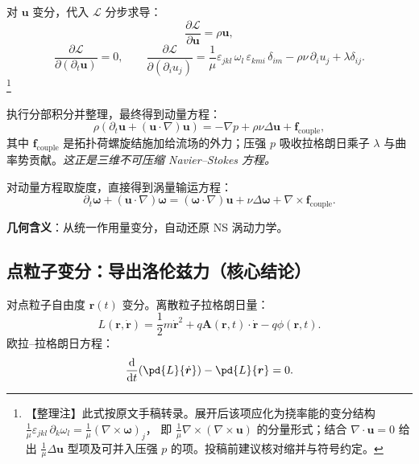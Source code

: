 \documentclass[11pt]{ctexart}
\newcommand{\ve}[1]{\bm{#1}}                         %
\newcommand{\Ltot}{\mathcal{L}}                      %
\begin{document}
对 $\ve{u}$ 变分，代入 $\Ltot$ 分步求导：
\begin{equation}
\frac{\partial\Ltot}{\partial\ve{u}}=\rho\ve{u},
\label{eq:du}
\end{equation}
\begin{equation}
\frac{\partial\Ltot}{\partial(\partial_{t}\ve{u})}=0,\qquad
\frac{\partial\Ltot}{\partial(\partial_{i}u_{j})}
=\frac{1}{\mu}\varepsilon_{jkl}\,\omega_{l}\,\varepsilon_{kmi}\,\delta_{im}
-\rho\nu\,\partial_{i}u_{j}+\lambda\delta_{ij}.
\label{eq:dgradu}
\end{equation}
\footnote{【整理注】此式按原文手稿转录。展开后该项应化为挠率能的变分结构
$\frac{1}{\mu}\varepsilon_{jkl}\,\partial_{k}\omega_{l}=\frac{1}{\mu}(\nabla\times\ve{\omega})_{j}$，
即 $\frac{1}{\mu}\nabla\times(\nabla\times\ve{u})$ 的分量形式；结合 $\nabla\cdot\ve{u}=0$
给出 $\frac{1}{\mu}\Delta\ve{u}$ 型项及可并入压强 $p$ 的项。投稿前建议核对缩并与符号约定。}

执行分部积分并整理，最终得到动量方程：
\begin{equation}
\rho\left(\partial_{t}\ve{u}+(\ve{u}\cdot\nabla)\ve{u}\right)
=-\nabla p+\rho\nu\Delta\ve{u}+\ve{f}_{\mathrm{couple}},
\label{eq:NS}
\end{equation}
其中 $\ve{f}_{\mathrm{couple}}$ 是拓扑荷螺旋结施加给流场的外力；压强 $p$ 吸收拉格朗日乘子 $\lambda$ 与曲率势贡献。\emph{这正是三维不可压缩 Navier--Stokes 方程。}

对动量方程取旋度，直接得到涡量输运方程：
\begin{equation}
\partial_{t}\ve{\omega}+(\ve{u}\cdot\nabla)\ve{\omega}
=(\ve{\omega}\cdot\nabla)\ve{u}+\nu\Delta\ve{\omega}+\nabla\times\ve{f}_{\mathrm{couple}}.
\label{eq:vorticity-transport}
\end{equation}

\noindent\textbf{几何含义}：从统一作用量变分，自动还原 NS 涡动力学。

\subsection{点粒子变分：导出洛伦兹力（核心结论）}

对点粒子自由度 $\ve{r}(t)$ 变分。离散粒子拉格朗日量：
\begin{equation}
L(\ve{r},\dot{\ve{r}})=\frac{1}{2}m\dot{\ve{r}}^{2}+q\ve{A}(\ve{r},t)\cdot\dot{\ve{r}}-q\phi(\ve{r},t).
\label{eq:Lpoint}
\end{equation}
欧拉--拉格朗日方程：
\begin{equation}
\dv{}{t}\!\left(\pd{L}{\dot{\ve{r}}}\right)-\pd{L}{\ve{r}}=0.
\label{eq:ELparticle}
\end{equation}
\end{document}
